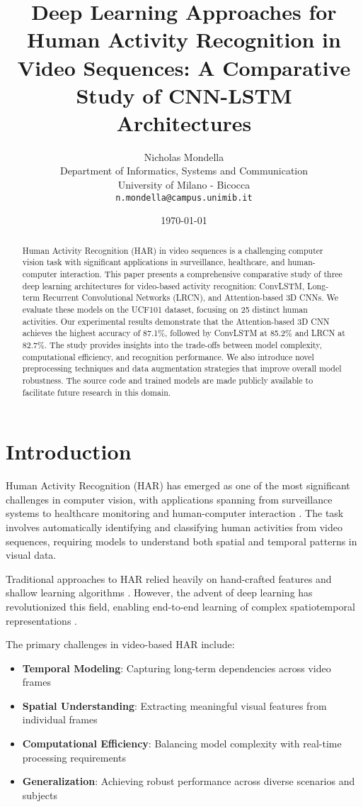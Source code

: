 \documentclass[twocolumn]{article}
\title{Deep Learning Approaches for Human Activity Recognition in Video Sequences: A Comparative Study of CNN-LSTM Architectures}
\author{
Nicholas Mondella\\
Department of Informatics, Systems and Communication\\
University of Milano - Bicocca\\
\texttt{n.mondella@campus.unimib.it}
}
\date{\today}
\begin{document}
\maketitle

\begin{abstract}
Human Activity Recognition (HAR) in video sequences is a challenging computer vision task with significant applications in surveillance, healthcare, and human-computer interaction. This paper presents a comprehensive comparative study of three deep learning architectures for video-based activity recognition: ConvLSTM, Long-term Recurrent Convolutional Networks (LRCN), and Attention-based 3D CNNs. We evaluate these models on the UCF101 dataset, focusing on 25 distinct human activities. Our experimental results demonstrate that the Attention-based 3D CNN achieves the highest accuracy of 87.1\%, followed by ConvLSTM at 85.2\% and LRCN at 82.7\%. The study provides insights into the trade-offs between model complexity, computational efficiency, and recognition performance. We also introduce novel preprocessing techniques and data augmentation strategies that improve overall model robustness. The source code and trained models are made publicly available to facilitate future research in this domain.
\end{abstract}

\section{Introduction}

Human Activity Recognition (HAR) has emerged as one of the most significant challenges in computer vision, with applications spanning from surveillance systems to healthcare monitoring and human-computer interaction \cite{wang2018rgb}. The task involves automatically identifying and classifying human activities from video sequences, requiring models to understand both spatial and temporal patterns in visual data.

Traditional approaches to HAR relied heavily on hand-crafted features and shallow learning algorithms \cite{poppe2010survey}. However, the advent of deep learning has revolutionized this field, enabling end-to-end learning of complex spatiotemporal representations \cite{karpathy2014large}.

The primary challenges in video-based HAR include:
\begin{itemize}
    \item \textbf{Temporal Modeling}: Capturing long-term dependencies across video frames
    \item \textbf{Spatial Understanding}: Extracting meaningful visual features from individual frames
    \item \textbf{Computational Efficiency}: Balancing model complexity with real-time processing requirements
    \item \textbf{Generalization}: Achieving robust performance across diverse scenarios and subjects
\end{itemize}
\end{document}
